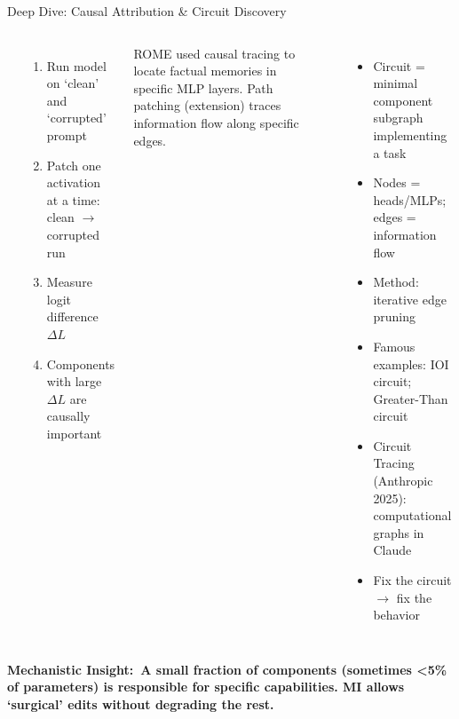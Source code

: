 \begin{frame}{Deep Dive: Causal Attribution \& Circuit Discovery}
  \begin{columns}[T]
    {\small\bfseries{}}
    \begin{enumerate}\footnotesize\setlength\itemsep{3pt}
      \item Run model on `clean' and `corrupted' prompt
      \item Patch one activation at a time: clean $\to$ corrupted run
      \item Measure logit difference $\Delta L$
      \item Components with large $\Delta L$ are causally important
    \end{enumerate}
    \vspace{0.2em}
    {\footnotesize ROME used causal tracing to locate factual memories
      in specific MLP layers. Path patching (extension) traces information
      flow along specific edges.}

    {\small\bfseries{}}
    \begin{itemize}\footnotesize\setlength\itemsep{3pt}
      \item Circuit = minimal component subgraph implementing a task
      \item Nodes = heads/MLPs; edges = information flow
      \item Method: iterative edge pruning
      \item Famous examples: IOI circuit; Greater-Than circuit
      \item Circuit Tracing (Anthropic 2025): computational graphs in Claude
      \item Fix the circuit $\to$ fix the behavior
    \end{itemize}
  \end{columns}
  \vspace{0.3em}
  \begin{ucrinfo}[UCRnavy]
    \footnotesize\bfseries Mechanistic Insight:\normalfont\ A small fraction of
    components (sometimes \textless5\% of parameters) is responsible for specific
    capabilities. MI allows `surgical' edits without degrading the rest.
  \end{ucrinfo}
\end{frame}

